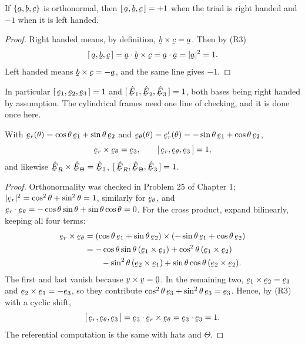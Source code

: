 \begin{lemma}\label{lem:boxortho}
If $\{\ba,\bb,\bc\}$ is orthonormal, then $\tbox\ba\bb\bc=+1$ when the
triad is right handed and $-1$ when it is left handed.
\end{lemma}

\begin{proof}
Right handed means, by definition, $\bb\times\bc=\ba$. Then by (R3)
\[
   \tbox\ba\bb\bc=\ip{\ba}{\bb\times\bc}=\ip\ba\ba=|\ba|^{2}=1 .
\]
Left handed means $\bb\times\bc=-\ba$, and the same line gives $-1$.
\end{proof}

In particular $\tbox{\be_{1}}{\be_{2}}{\be_{3}}=1$ and
$\tbox{\hbE_{1}}{\hbE_{2}}{\hbE_{3}}=1$, both bases being right handed by
assumption. The cylindrical frames need one line of checking, and it is
done once here.

\begin{lemma}
\label{lem:polarframe}
With $\ber(\theta)=\cos\theta\,\be_{1}+\sin\theta\,\be_{2}$ and
$\bet(\theta)=\ber'(\theta)=-\sin\theta\,\be_{1}+\cos\theta\,\be_{2}$,
\[
   \ber\times\bet=\be_{3},\qquad
   \tbox{\ber}{\bet}{\be_{3}}=1 ,
\]
and likewise $\hER\times\hETh=\hbE_{3}$,
$\tbox{\hER}{\hETh}{\hbE_{3}}=1$.
\end{lemma}

\begin{proof}
Orthonormality was checked in Problem 25 of Chapter 1;
$|\ber|^{2}=\cos^{2}\theta+\sin^{2}\theta=1$, similarly for $\bet$, and
$\ip\ber\bet=-\cos\theta\sin\theta+\sin\theta\cos\theta=0$. For the cross
product, expand bilinearly, keeping all four terms:
\[
\begin{aligned}
   \ber\times\bet
   &=(\cos\theta\,\be_{1}+\sin\theta\,\be_{2})
     \times(-\sin\theta\,\be_{1}+\cos\theta\,\be_{2})\\
   &=-\cos\theta\sin\theta\,(\be_{1}\times\be_{1})
     +\cos^{2}\theta\,(\be_{1}\times\be_{2})\\
   &\qquad-\sin^{2}\theta\,(\be_{2}\times\be_{1})
     +\sin\theta\cos\theta\,(\be_{2}\times\be_{2}).
\end{aligned}
\]
The first and last vanish because $\bv\times\bv=\bze$. In the remaining
two, $\be_{1}\times\be_{2}=\be_{3}$ and $\be_{2}\times\be_{1}=-\be_{3}$,
so they contribute $\cos^{2}\theta\,\be_{3}+\sin^{2}\theta\,\be_{3}
=\be_{3}$. Hence, by (R3) with a cyclic shift,
\[
   \tbox{\ber}{\bet}{\be_{3}}=\ip{\be_{3}}{\ber\times\bet}
   =\ip{\be_{3}}{\be_{3}}=1 .
\]
The referential computation is the same with hats and $\Theta$.
\end{proof}

